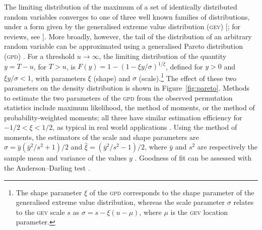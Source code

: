 The limiting distribution of the maximum of a set of identically distributed random variables converges to one of three well known families of distributions, under a form given by the generalised extreme value distribution (\textsc{gev}) [\citet{Gnedenko1943}; for reviews, see \citet{Leadbetter1983, Davison2015}]. More broadly, however, the tail of the distribution of an arbitrary random variable can be approximated using a generalised Pareto distribution (\textsc{gpd}) \citep{PicklandsIII1975}. For a threshold $u\rightarrow\infty$, the limiting distribution of the quantity $y=T-u$, for $T>u$, is $F(y) = 1-(1-\xi y/\sigma)^{1/\xi}$, defined for $y>0$ and $\xi y/\sigma<1$, with parameters $\xi$ (shape) and $\sigma$ (scale).\footnote{The shape parameter $\xi$ of the \textsc{gpd} corresponds to the shape parameter of the generalised extreme value distribution, whereas the scale parameter $\sigma$ relates to the \textsc{gev} scale $s$ as $\sigma=s-\xi(u-\mu)$, where $\mu$ is the \textsc{gev} location parameter.} The effect of these two parameters on the density distribution is shown in Figure~\ref{fig:pareto}. Methods to estimate the two parameters of the \textsc{gpd} from the observed permutation statistics include maximum likelihood, the method of moments, or the method of probability-weighted moments; all three have similar estimation efficiency for $-1/2 < \xi < 1/2$, as typical in real world applications \citep{Hosking1987, Knijnenburg2009}. Using the method of moments, the estimators of the scale and shape parameters are $\hat{\sigma} = \bar{y}(\bar{y}^2/s^2+1)/2$ and $\hat{\xi}=(\bar{y}^2/s^2-1)/2$, where $\bar{y}$ and $s^2$ are respectively the sample mean and variance of the values $y$ \citep{Hosking1987}. Goodness of fit can be assessed with the Anderson--Darling test \citep{Anderson1952, Choulakian2001, Knijnenburg2009}.

